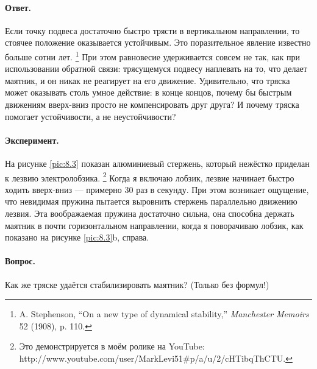 \paragraph{Ответ.}
Если точку подвеса достаточно быстро трясти в вертикальном направлении, то стоячее положение оказывается устойчивым.
Это поразительное явление известно больше сотни лет.%
\footnote{A. Stephenson, ``On a new type of dynamical stability,'' \emph{Manchester Memoirs} 52 (1908), p. 110.}
При этом равновесие удерживается совсем не так, как при использовании обратной связи:
трясущемуся подвесу наплевать на то, что делает маятник, и он никак не реагирует на его движение.
Удивительно, что тряска может оказывать столь умное действие:
в конце концов, почему бы быстрым движениям вверх-вниз просто не компенсировать друг друга?
И почему тряска помогает устойчивости, а не неустойчивости?

\paragraph{Эксперимент.}
На рисунке \ref{pic:8.3} показан алюминиевый стержень, который нежёстко приделан к лезвию электролобзика.%
\footnote{Это демонстрируется в моём ролике на YouTube: http://www.youtube.com/user/MarkLevi51\#p/a/u/2/cHTibqThCTU.}
Когда я включаю лобзик, лезвие начинает быстро ходить вверх-вниз --- примерно 30 раз в секунду.
При этом возникает ощущение, что невидимая пружина пытается выровнить стержень параллельно движению лезвия.
Эта воображаемая пружина достаточно сильна, она способна держать маятник в почти горизонтальном направлении, когда я поворачиваю лобзик, как показано на рисунке \ref{pic:8.3}b, справа.

\paragraph{Вопрос.}
Как же тряске удаётся стабилизировать маятник?
(Только без формул!)

